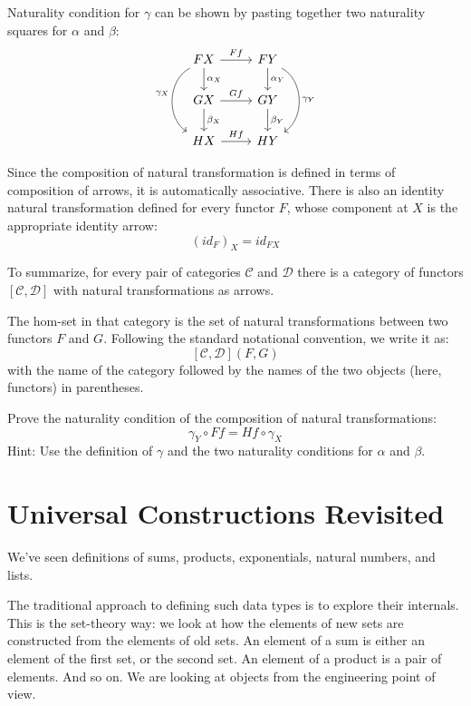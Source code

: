 \documentclass[DaoFP]{subfiles}
\begin{document}
Naturality condition for $\gamma$ can be shown by pasting together two naturality squares for $\alpha$ and $\beta$:
\[
 \begin{tikzcd}
 F X
 \arrow[d, "\alpha_X"]
 \arrow[r, "F f"]
 \arrow[dd, bend right = 60, "\gamma_X"']
 &
F Y
  \arrow[d, "\alpha_Y"]
 \arrow[dd, bend left = 60, "\gamma_Y"]
 \\
G X
 \arrow[r, "G f"]
 \arrow[d, "\beta_X"]
& G Y
\arrow[d, "\beta_Y"]
\\
H X
\arrow[r, "H f"]
& H Y
 \end{tikzcd}
\]

Since the composition of natural transformation is defined in terms of composition of arrows, it is automatically associative. There is also an identity natural transformation defined for every functor $F$, whose component at $X$ is the appropriate identity arrow:
\[ (id_F)_X = id_{F X} \]

To summarize, for every pair of categories $\mathcal{C}$ and $\mathcal{D}$ there is a category of functors $[\mathcal{C}, \mathcal{D}]$ with natural transformations as arrows. 

The hom-set in that category is the set of natural transformations between two functors $F$ and $G$. Following the standard notational convention, we write it as:
\[ [\mathcal{C}, \mathcal{D}](F, G) \]
with the name of the category followed by the names of the two objects (here, functors) in parentheses.

\begin{exercise}
Prove the naturality condition of the composition of natural transformations:
\[ \gamma_Y \circ F f = H f \circ \gamma_X \]
Hint: Use the definition of $\gamma$ and the two naturality conditions for $\alpha$ and $\beta$.
\end{exercise}



\section{Universal Constructions Revisited}

We've seen definitions of sums, products, exponentials, natural numbers, and lists. 

The traditional approach to defining such data types is to explore their internals. This is the set-theory way: we look at how the elements of new sets are constructed from the elements of old sets. An element of a sum is either an element of the first set, or the second set. An element of a product is a pair of elements. And so on. We are looking at objects from the engineering point of view.
\end{document}
